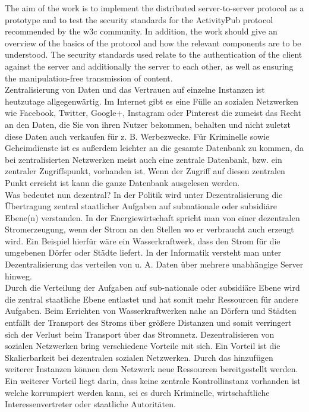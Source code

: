 {	%
	The aim of the work is to implement the distributed server-to-server protocol as a prototype and to test the security standards for the ActivityPub protocol recommended by the \gls{w3c} community. In addition, the work should give an overview of the basics of the protocol and how the relevant components are to be understood. The security standards used relate to the authentication of the client against the server and additionally the server to each other, as well as ensuring the manipulation-free transmission of content.\\

}{
	Zentralisierung von Daten und das Vertrauen auf einzelne Instanzen ist heutzutage allgegenwärtig. Im Internet gibt es eine Fülle an sozialen Netzwerken wie Facebook, Twitter, Google+, Instagram oder Pinterest die zumeist das Recht an den Daten, die Sie von ihren Nutzer bekommen, behalten und nicht zuletzt diese Daten auch verkaufen für z. B. Werbezwecke. Für Kriminelle sowie Geheimdienste ist es außerdem leichter an die gesamte Datenbank zu kommen, da bei zentralisierten Netzwerken meist auch eine zentrale Datenbank, bzw. ein zentraler Zugriffspunkt, vorhanden ist. Wenn der Zugriff auf diesen zentralen Punkt erreicht ist kann die ganze Datenbank ausgelesen werden.\\
	
	Was bedeutet nun dezentral? In der Politik wird unter Dezentralisierung \glqq die Übertragung zentral staatlicher Aufgaben auf subnationale oder subsidiäre Ebene(n) verstanden\grqq\cite{wikipedia-dezentralisierung-politik}. In der Energiewirtschaft spricht man von einer \glqq dezentralen Stromerzeugung\grqq, wenn der Strom an den Stellen wo er verbraucht auch erzeugt wird. Ein Beispiel hierfür wäre ein Wasserkraftwerk, dass den Strom für die umgebenen Dörfer oder Städte liefert\cite{wikipedia-dezentralisierung-energie}. In der Informatik versteht man unter Dezentralisierung das verteilen von u. A. Daten über mehrere unabhängige Server hinweg.\\
	
	Durch die Verteilung der Aufgaben auf sub-nationale oder subsidiäre Ebene wird die zentral staatliche Ebene entlastet und hat somit mehr Ressourcen für andere Aufgaben. Beim Errichten von Wasserkraftwerken nahe an Dörfern und Städten entfällt der Transport des Stroms über größere Distanzen und somit verringert sich der Verlust beim Transport über das Stromnetz. Dezentralisieren von sozialen Netzwerken bring verschiedene Vorteile mit sich. Ein Vorteil ist die Skalierbarkeit bei dezentralen sozialen Netzwerken. Durch das hinzufügen weiterer Instanzen können dem Netzwerk neue Ressourcen bereitgestellt werden. Ein weiterer Vorteil liegt darin, dass keine zentrale Kontrollinstanz vorhanden ist welche korrumpiert werden kann, sei es durch Kriminelle, wirtschaftliche Interessenvertreter oder staatliche Autoritäten.\\
	
}

